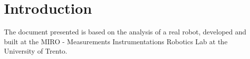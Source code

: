\section{Introduction}
The document presented is based on the analysis of a real robot, developed and built at the MIRO - Measurements Instrumentations Robotics Lab at the University of Trento.